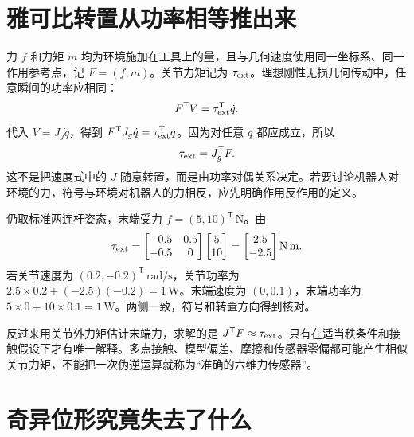 \section{雅可比转置从功率相等推出来}
力 $f$ 和力矩 $m$ 均为环境施加在工具上的量，且与几何速度使用同一坐标系、同一作用参考点，记 $F=(f,m)$。关节力矩记为 $\tau_{\rm ext}$。理想刚性无损几何传动中，任意瞬间的功率应相同：
\begin{equation}
 F^\mathsf T V=\tau_{\rm ext}^\mathsf T\dot q.
\end{equation}
代入 $V=J_g\dot q$，得到 $F^\mathsf TJ_g\dot q=\tau_{\rm ext}^\mathsf T\dot q$。因为对任意 $\dot q$ 都应成立，所以
\begin{equation}\label{eq:jac_force}
 \tau_{\rm ext}=J_g^\mathsf TF.
\end{equation}
这不是把速度式中的 $J$ 随意转置，而是由功率对偶关系决定。若要讨论机器人对环境的力，符号与环境对机器人的力相反，应先明确作用反作用的定义。

\begin{examplebox}[算例 验证末端功率与关节功率完全一致]
仍取标准两连杆姿态，末端受力 $f=(5,10)^\mathsf T\,\mathrm N$。由
\[
 \tau_{\rm ext}=\begin{bmatrix}-0.5&0.5\\-0.5&0\end{bmatrix}
 \begin{bmatrix}5\\10\end{bmatrix}
 =\begin{bmatrix}2.5\\-2.5\end{bmatrix}\mathrm{N\,m}.
\]
若关节速度为 $(0.2,-0.2)^\mathsf T\,\mathrm{rad/s}$，关节功率为 $2.5\times0.2+(-2.5)(-0.2)=1\,\mathrm W$。末端速度为 $(0,0.1)$，末端功率为 $5\times0+10\times0.1=1\,\mathrm W$。两侧一致，符号和转置方向得到核对。
\end{examplebox}

反过来用关节外力矩估计末端力，求解的是 $J^\mathsf TF\approx\tau_{\rm ext}$。只有在适当秩条件和接触假设下才有唯一解释。多点接触、模型偏差、摩擦和传感器零偏都可能产生相似关节力矩，不能把一次伪逆运算就称为“准确的六维力传感器”。

\section{奇异位形究竟失去了什么}
